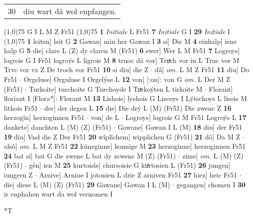 \documentclass[8pt,a4paper,notitlepage]{article}
\begin{document}
\begin{table}[ht]
\begin{minipage}[t]{0.5\linewidth}
\begin{tabular}{rl}
30 & diu wart dâ wol enpfangen.\\ 
\end{tabular}
\scriptsize
\line(1,0){75} \newline
G I L M Z Fr51 \newline
\line(1,0){75} \newline
\textbf{1} \textit{Initiale} L Fr51  \textbf{7} \textit{Initiale} G I  \textbf{29} \textit{Initiale} I  \newline
\line(1,0){75} \newline
\textbf{1} leiten] leit G \textbf{2} Gawan] min her Gawan I \textbf{3} si] Die M \textbf{4} einhalp] iene halp G \textbf{5} die] clare L (Z) dy claren M (Fr51) \textbf{6} swer] Wer L M Fr51 \textbf{7} Logroys] logrois G I Fr51 logroýs L ligrois M \textbf{8} truoc dâ vor] Truͯch vor in L Truc vor M Trvc vor vz Z De troch vor Fr51 \textbf{10} si diu] die Z  $\cdot$ dâ] \textit{om.} L M Z Fr51 \textbf{11} diu] Do Fr51  $\cdot$ Orgeluse] Orguluse I Orgelýse L \textbf{12} von] [:on]: von G \textit{om.} L Der M Z (Fr51)  $\cdot$ Turkoite] turchoite G Turchoyde I Tuͯrkoýten L tirkoite M  $\cdot$ Florant] floriant I [Flora*]: Florant M \textbf{13} Lishois] lyshois G Liscoys I Lýtschoys L lisois M lithois Fr51  $\cdot$ der] der degen L \textbf{15} die] Die drý L (M) (Fr51) Die zwene Z \textbf{16} herzogîn] herzoginnen Fr51  $\cdot$ von] de L  $\cdot$ Logroys] logrois G M Fr51 Logroýs L \textbf{17} dankete] danchten L (M) (Z) (Fr51)  $\cdot$ Gawane] Gawan I L (M) \textbf{18} diu] der Fr51 \textbf{19} diu] Vnd die Z Der Fr51 \textbf{20} wîplîchem] wipplichen G (Fr51) \textbf{21} dô] Da M Z  $\cdot$ alsô] \textit{om.} L M Z Fr51 \textbf{22} küneginne] konnige M \textbf{23} herzoginne] herzoginnen Fr51 \textbf{24} bat si] bat G die zwene L bat dy zcwene M (Z) (Fr51)  $\cdot$ zime] \textit{om.} L (M) (Z) (Fr51)  $\cdot$ gên] ien M \textbf{25} kurtoisîe] chursoisie G kuͯrtosien L (Fr51) \textbf{26} jungen] iungern Z  $\cdot$ Arnive] Arniue I jotonien L drie Z arniven Fr51 \textbf{27} hiez] heic Fr51  $\cdot$ die] diese L (M) (Z) (Fr51) \textbf{29} Gawane] Gawan I L (M)  $\cdot$ gegangen] chomen I \textbf{30} ir enphahen wart da wol vernomen I \newline
\end{minipage}
\hspace{0.5cm}
\begin{minipage}[t]{0.5\linewidth}
\small
\begin{center}*T
\end{center}
\begin{tabular}{rl}

\end{tabular}
\end{minipage}
\end{table}
\end{document}
